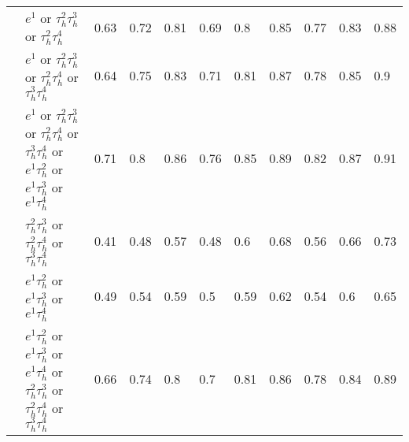 \begin{table}
{\begin{tabular}{|c|c|c||lllllllll}
\multicolumn{1}{|l|}{} & \multicolumn{2}{l||}{$e^{1}$ or $\tau_{h}^{2}\tau_{h}^{3}$ or $\tau_{h}^{2}\tau_{h}^{4}$} & \multicolumn{1}{l|}{0.63} & \multicolumn{1}{l|}{0.72} & \multicolumn{1}{l|}{0.81} & \multicolumn{1}{l|}{0.69} & \multicolumn{1}{l|}{0.8} & \multicolumn{1}{l|}{0.85} & \multicolumn{1}{l|}{0.77} & \multicolumn{1}{l|}{0.83} & \multicolumn{1}{l|}{0.88} \\
\multicolumn{1}{|l|}{} & \multicolumn{2}{l||}{$e^{1}$ or $\tau_{h}^{2}\tau_{h}^{3}$ or $\tau_{h}^{2}\tau_{h}^{4}$ or $\tau_{h}^{3}\tau_{h}^{4}$} & \multicolumn{1}{l|}{0.64} & \multicolumn{1}{l|}{0.75} & \multicolumn{1}{l|}{0.83} & \multicolumn{1}{l|}{0.71} & \multicolumn{1}{l|}{0.81} & \multicolumn{1}{l|}{0.87} & \multicolumn{1}{l|}{0.78} & \multicolumn{1}{l|}{0.85} & \multicolumn{1}{l|}{0.9} \\
\multicolumn{1}{|l|}{} & \multicolumn{2}{l||}{$e^{1}$ or $\tau_{h}^{2}\tau_{h}^{3}$ or $\tau_{h}^{2}\tau_{h}^{4}$ or $\tau_{h}^{3}\tau_{h}^{4}$ or $e^{1}\tau_{h}^{2}$ or $e^{1}\tau_{h}^{3}$ or $e^{1}\tau_{h}^{4}$} & \multicolumn{1}{l|}{0.71} & \multicolumn{1}{l|}{0.8} & \multicolumn{1}{l|}{0.86} & \multicolumn{1}{l|}{0.76} & \multicolumn{1}{l|}{0.85} & \multicolumn{1}{l|}{0.89} & \multicolumn{1}{l|}{0.82} & \multicolumn{1}{l|}{0.87} & \multicolumn{1}{l|}{0.91} \\
\multicolumn{1}{|l|}{} & \multicolumn{2}{l||}{$\tau_{h}^{2}\tau_{h}^{3}$ or $\tau_{h}^{2}\tau_{h}^{4}$ or $\tau_{h}^{3}\tau_{h}^{4}$} & \multicolumn{1}{l|}{0.41} & \multicolumn{1}{l|}{0.48} & \multicolumn{1}{l|}{0.57} & \multicolumn{1}{l|}{0.48} & \multicolumn{1}{l|}{0.6} & \multicolumn{1}{l|}{0.68} & \multicolumn{1}{l|}{0.56} & \multicolumn{1}{l|}{0.66} & \multicolumn{1}{l|}{0.73} \\
\multicolumn{1}{|l|}{} & \multicolumn{2}{l||}{$e^{1}\tau_{h}^{2}$ or $e^{1}\tau_{h}^{3}$ or $e^{1}\tau_{h}^{4}$} & \multicolumn{1}{l|}{0.49} & \multicolumn{1}{l|}{0.54} & \multicolumn{1}{l|}{0.59} & \multicolumn{1}{l|}{0.5} & \multicolumn{1}{l|}{0.59} & \multicolumn{1}{l|}{0.62} & \multicolumn{1}{l|}{0.54} & \multicolumn{1}{l|}{0.6} & \multicolumn{1}{l|}{0.65} \\
\multicolumn{1}{|l|}{} & \multicolumn{2}{l||}{$e^{1}\tau_{h}^{2}$ or $e^{1}\tau_{h}^{3}$ or $e^{1}\tau_{h}^{4}$ or $\tau_{h}^{2}\tau_{h}^{3}$ or $\tau_{h}^{2}\tau_{h}^{4}$ or $\tau_{h}^{3}\tau_{h}^{4}$} & \multicolumn{1}{l|}{0.66} & \multicolumn{1}{l|}{0.74} & \multicolumn{1}{l|}{0.8} & \multicolumn{1}{l|}{0.7} & \multicolumn{1}{l|}{0.81} & \multicolumn{1}{l|}{0.86} & \multicolumn{1}{l|}{0.78} & \multicolumn{1}{l|}{0.84} & \multicolumn{1}{l|}{0.89} \\

\end{tabular}}
\end{table}
